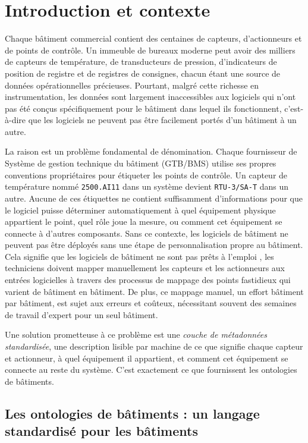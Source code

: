 \section{Introduction et contexte}
\label{sec:introduction}

Chaque bâtiment commercial contient des centaines de capteurs, d'actionneurs et de points de contrôle.
Un immeuble de bureaux moderne peut avoir des milliers de capteurs de température, de transducteurs de pression, d'indicateurs de position de registre et de registres de consignes, chacun étant une source de données opérationnelles précieuses.
Pourtant, malgré cette richesse en instrumentation, les données sont largement inaccessibles aux logiciels qui n'ont pas été conçus spécifiquement pour le bâtiment dans lequel ils fonctionnent, c'est-à-dire que les logiciels ne peuvent pas être facilement portés d'un bâtiment à un autre.

La raison est un problème fondamental de dénomination.
Chaque fournisseur de Système de gestion technique du bâtiment (GTB/BMS) utilise ses propres conventions propriétaires pour étiqueter les points de contrôle.
Un capteur de température nommé \texttt{2500.AI11} dans un système devient \texttt{RTU-3/SA-T} dans un autre.
Aucune de ces étiquettes ne contient suffisamment d'informations pour que le logiciel puisse déterminer automatiquement à quel équipement physique appartient le point, quel rôle joue la mesure, ou comment cet équipement se connecte à d'autres composants.
Sans ce contexte, les logiciels de bâtiment ne peuvent pas être déployés sans une étape de personnalisation propre au bâtiment.
Cela signifie que \og les logiciels de bâtiment ne sont pas \fg{} \og prêts à l'emploi \fg{}, les techniciens doivent mapper manuellement les capteurs et les actionneurs aux entrées logicielles à travers des processus de mappage des points fastidieux qui varient de bâtiment en bâtiment.
De plus, ce mappage manuel, un effort bâtiment par bâtiment, est sujet aux erreurs et coûteux, nécessitant souvent des semaines de travail d'expert pour un seul bâtiment.

Une solution prometteuse à ce problème est une \emph{couche de métadonnées standardisée}, une description lisible par machine de ce que signifie chaque capteur et actionneur, à quel équipement il appartient, et comment cet équipement se connecte au reste du système.
C'est exactement ce que fournissent les ontologies de bâtiments.

\subsection{Les ontologies de bâtiments : un langage standardisé pour les bâtiments}
\label{subsec:ontologies}

